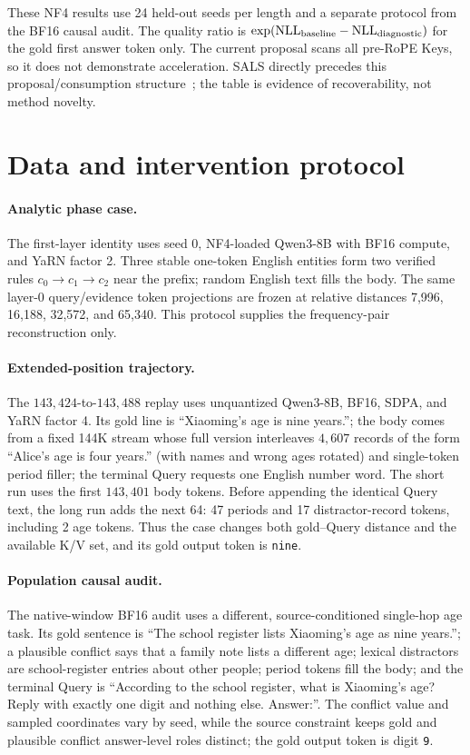 These NF4 results use 24 held-out seeds per length and a separate protocol from
the BF16 causal audit.  The quality ratio is
$\exp(\mathrm{NLL}_{\rm baseline}-\mathrm{NLL}_{\rm diagnostic})$ for the gold
first answer token only.  The current proposal scans all pre-RoPE Keys, so it
does not demonstrate acceleration.  SALS directly precedes this
proposal/consumption structure~\citep{mu2025sals}; the table is evidence of
recoverability, not method novelty.

\section{Data and intervention protocol}
\label{app:protocol}

\paragraph{Analytic phase case.}
The first-layer identity uses seed 0, NF4-loaded Qwen3-8B with BF16 compute, and
YaRN factor 2.  Three stable one-token English entities form two verified rules
$c_0\rightarrow c_1\rightarrow c_2$ near the prefix; random English text fills
the body.  The same layer-0 query/evidence token projections are frozen at
relative distances 7,996, 16,188, 32,572, and 65,340.  This protocol supplies
the frequency-pair reconstruction only.

\paragraph{Extended-position trajectory.}
The $143{,}424$-to-$143{,}488$ replay uses unquantized Qwen3-8B, BF16, SDPA, and
YaRN factor 4.  Its gold line is ``Xiaoming's age is nine years.''; the body
comes from a fixed 144K stream whose full version interleaves $4{,}607$ records
of the form ``Alice's age is four years.'' (with names and wrong ages rotated)
and single-token period filler; the terminal Query requests one English number
word.  The short run uses the first $143{,}401$ body tokens.  Before appending
the identical Query text, the long run adds the next 64: 47 periods and 17
distractor-record tokens, including 2 age tokens.  Thus the
case changes both gold--Query distance and the available K/V set, and its gold
output token is \texttt{nine}.

\paragraph{Population causal audit.}
The native-window BF16 audit uses a different, source-conditioned single-hop
age task.  Its gold sentence is ``The school register lists Xiaoming's age as
nine years.''; a plausible conflict says that a family note lists a different
age; lexical distractors are school-register entries about other people;
period tokens fill the body; and the terminal Query is ``According to the school
register, what is Xiaoming's age? Reply with exactly one digit and nothing else.
Answer:''.  The conflict value and sampled coordinates vary by seed, while the
source constraint keeps gold and plausible conflict answer-level roles
distinct; the gold output token is digit \texttt{9}.

